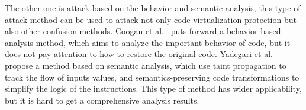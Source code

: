 The other one is attack based on the behavior and semantic analysis, this type of attack method can be used to attack not only code virtualization protection but also other confusion methods.
Coogan et al.~\cite{coogan2011deobfuscation} puts forward a behavior based analysis method, which aims to analyze the important behavior of code, but it does not pay attention to how to restore the original code. %
Yadegari et al.~\cite{Yadegari2015A} propose a method based on semantic analysis, which use taint propagation to track the flow of inputs values, and semantics-preserving code transformations to simplify the logic of the instructions. 
This type of method has wider applicability, but it is hard to get a comprehensive analysis results.

